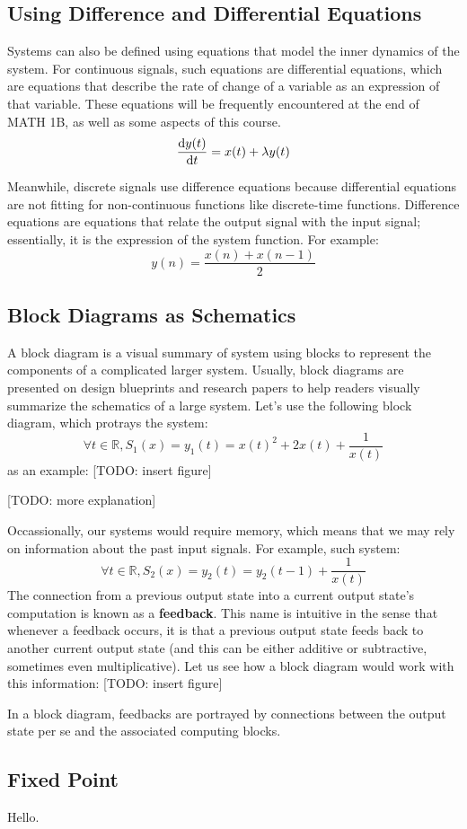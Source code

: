 \subsection{Using Difference and Differential Equations}
Systems can also be defined using equations that model the inner dynamics of the system.
For continuous signals, such equations are differential equations, which are equations that describe the rate of change of a variable as an expression of that variable.
These equations will be frequently encountered at the end of MATH 1B, as well as some aspects of this course.
\[
    \dv{y(t)}{t} = x(t) + \lambda y(t)
\]

Meanwhile, discrete signals use difference equations because differential equations are not fitting for non-continuous functions like discrete-time functions.
Difference equations are equations that relate the output signal with the input signal; essentially, it is the expression of the system function.
For example:
\[
    y(n) = \frac{x(n) + x(n - 1)}{2}
\]

\subsection{Block Diagrams as Schematics}
A block diagram is a visual summary of system using blocks to represent the components of a complicated larger system.
Usually, block diagrams are presented on design blueprints and research papers to help readers visually summarize the schematics of a large system.
Let's use the following block diagram, which protrays the system:
\[
    \forall t \in \mathbb{R}, S_1(x) = y_1(t) = x(t)^2 + 2x(t) + \frac{1}{x(t)}
\]
as an example:
[TODO: insert figure]

[TODO: more explanation]

Occassionally, our systems would require memory, which means that we may rely on information about the past input signals.
For example, such system:
\[
    \forall t \in \mathbb{R}, S_2(x) = y_2(t) = y_2(t - 1) + \frac{1}{x(t)}
\]
The connection from a previous output state into a current output state's computation is known as a \textbf{feedback}.
This name is intuitive in the sense that whenever a feedback occurs, it is that a previous output state feeds back to another current output state (and this can be either additive or subtractive, sometimes even multiplicative).
Let us see how a block diagram would work with this information:
[TODO: insert figure]

In a block diagram, feedbacks are portrayed by connections between the output state per se and the associated computing blocks.

\subsection{Fixed Point}
Hello.
